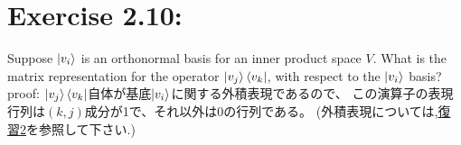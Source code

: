 \section{\Large Exercise 2.10:}
Suppose $\ket{v_i}$ is an orthonormal basis for an inner product space $V$.
What is the matrix representation for the operator $\ket{v_j}\bra{v_k}$, 
with respect to the $\ket{v_i}$ basis?
\newline
{\Large proof:}
$\ket{v_j}\bra{v_k}$自体が基底$\ket{v_i}$に関する外積表現であるので、
この演算子の表現行列は$(k, j)$成分が1で、それ以外は0の行列である。
(外積表現については,\hyperlink{hukushuu2}{復習2}を参照して下さい.)
